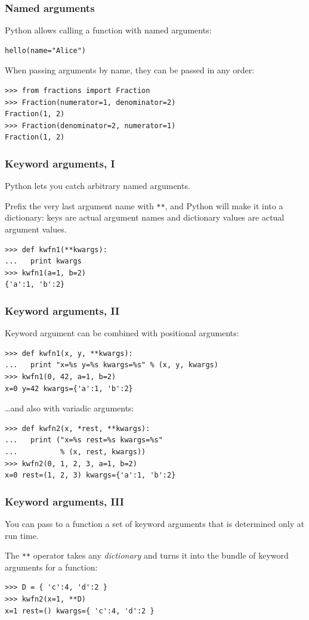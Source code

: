 \documentclass[english,serif,mathserif,xcolor=pdftex,dvipsnames,table]{beamer}
\begin{document}
\begin{frame}[fragile]
  \frametitle{Named arguments}
Python allows calling a function with named arguments:
\begin{lstlisting}
hello(name="Alice")
\end{lstlisting}
When passing arguments by name, they can be passed in any order:
\begin{lstlisting}
>>> from fractions import Fraction
>>> Fraction(numerator=1, denominator=2)
Fraction(1, 2)
>>> Fraction(denominator=2, numerator=1)
Fraction(1, 2)
\end{lstlisting}
\end{frame}


\begin{frame}[fragile]
  \frametitle{Keyword arguments, I}
  Python lets you catch arbitrary named arguments.

  \+
  Prefix the very last argument name with \texttt{**}, and Python
  will make it into a dictionary: keys are actual argument names and
  dictionary values are actual argument values.

  \+
\begin{lstlisting}
>>> def kwfn1(**kwargs):
...   print kwargs
>>> kwfn1(a=1, b=2)
{'a':1, 'b':2}
\end{lstlisting}
\end{frame}


\begin{frame}
  \frametitle{Keyword arguments, II}
  Keyword argument can be combined with positional arguments:
\begin{lstlisting}
>>> def kwfn1(x, y, **kwargs):
...   print "x=%s y=%s kwargs=%s" % (x, y, kwargs)
>>> kwfn1(0, 42, a=1, b=2)
x=0 y=42 kwargs={'a':1, 'b':2}
\end{lstlisting}

  \+
  \ldots and also with variadic arguments:
\begin{lstlisting}
>>> def kwfn2(x, *rest, **kwargs):
...   print ("x=%s rest=%s kwargs=%s"
...          % (x, rest, kwargs))
>>> kwfn2(0, 1, 2, 3, a=1, b=2)
x=0 rest=(1, 2, 3) kwargs={'a':1, 'b':2}
\end{lstlisting}
\end{frame}


\begin{frame}
  \frametitle{Keyword arguments, III}
  You can pass to a function a set of keyword arguments that is
  determined only at run time.

  The \texttt{**} operator takes any \emph{dictionary} and turns it
  into the bundle of keyword arguments for a function:
\begin{lstlisting}
>>> D = { 'c':4, 'd':2 }
>>> kwfn2(x=1, **D)
x=1 rest=() kwargs={ 'c':4, 'd':2 }
\end{lstlisting}
\end{frame}
\end{document}
